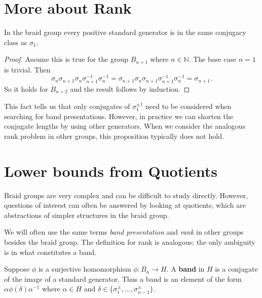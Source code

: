 \documentclass[12pt]{thesis}
\begin{document}
\section{More about Rank}

\begin{proposition} \cite{rudolph-braided-surfaces}
    \label{prop:same-conjugacy-class}
    In the braid group every positive standard
    generator is in the same conjugacy class
    as $\sigma_{1}$.
\end{proposition}

\begin{proof}
    Assume this is true for the group $B_{n+1}$ where $n \in \mathbb{N}$.
    The base case $n = 1$ is trivial.
    Then
    \[
    \sigma_{n}\sigma_{n+1} \sigma_{n} \sigma_{n + 1}^{-1} \sigma_{n}^{-1}
        = \sigma_{n+1} \sigma_{n} \sigma_{n + 1} \sigma_{n + 1}^{-1} \sigma_{n}^{-1}
        = \sigma_{n + 1}.
    \]
    So it holds for $B_{n+2}$ and the result follows by induction.
\end{proof}
This fact tells us that only conjugates of $\sigma_{1}^{\pm 1}$
need to be considered when searching for band presentations.
However, in practice we can shorten the conjugate lengths by using other generators.
When we consider the analogous rank problem in other groups,
this proposition typically does not hold.

\section{Lower bounds from Quotients}

Braid groups are very complex and can be difficult to study directly.
However, questions of interest can often be answered by looking
at quotients, which are abstractions of simpler structures in the braid group.

We will often use the same terms \textit{band presentation} and \textit{rank}
in other groups besides the braid group.
The definition for rank is analogous; the only ambiguity is in what constitutes a band.
\begin{definition}
    Suppose $\phi$ is a surjective homomorphism $\phi \colon B_{n} \rightarrow H$.
    A \textbf{band} in $H$ is a conjugate of the image of a standard generator.
    Thus a band is an element of the form $\alpha\phi(\delta)\alpha^{-1}$
    where $\alpha \in H$ and $\delta \in \{\sigma_{1}^{\pm}, \ldots, \sigma_{n-1}^{\pm} \}$.
\end{definition}
\end{document}
